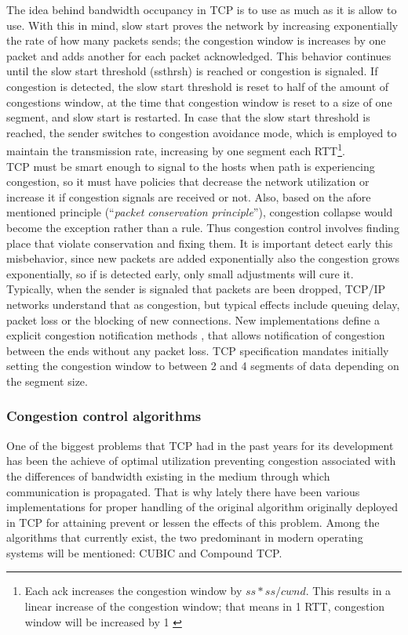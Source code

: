 The idea behind bandwidth occupancy in TCP is to use as much as it is allow to
use. With this in mind, slow start proves the network by increasing
exponentially the rate of how many packets sends; the congestion window is
increases by one packet and adds another for each packet acknowledged. This
behavior continues until the slow start threshold (ssthrsh) is reached or
congestion is signaled. If congestion is detected, the slow start threshold is
reset to half of the amount of congestions window, at the time that congestion
window is reset to a size of one segment, and slow start is restarted. In case
that the slow start threshold is reached, the sender switches to congestion
avoidance mode, which is employed to maintain the transmission rate,
increasing by one segment each RTT\footnote{Each ack increases the congestion
window by $ss*ss/cwnd$. This results in a linear increase of the congestion
window; that means in 1 RTT, congestion window will be increased by
1 \cite{JacobsonCAC} \cite{rfc879} \cite{rfc2460}}.\\

TCP must be smart enough to signal to the hosts when path is experiencing
congestion, so it must have policies that decrease the network utilization or
increase it if congestion signals are received or not. Also, based on the
afore mentioned principle (``\textit{packet conservation principle}''),
congestion collapse would become the exception rather than a rule. Thus
congestion control involves finding place that violate conservation and fixing
them. It is important detect early this misbehavior, since new packets are
added exponentially also the congestion grows exponentially, so if is detected
early, only small adjustments will cure it.\\

Typically, when the sender is signaled that packets are been dropped, TCP/IP
networks understand that as congestion, but typical effects include queuing
delay, packet loss or the blocking of new connections. New implementations
define a explicit congestion notification methods \cite{rfc3168}, that allows
notification of congestion between the ends without any packet loss. TCP
specification mandates initially setting the congestion window to between 2
and 4 segments of data depending on the segment size\cite{rfc3390}.

\subsubsection{Congestion control algorithms}
One of the biggest problems that TCP had in the past years for its development
has been the achieve of optimal utilization preventing congestion associated
with the differences of bandwidth existing in the medium through which
communication is propagated. That is why lately there have been various
implementations for proper handling of the original algorithm originally
deployed in TCP for attaining prevent or lessen the effects of this problem.
Among the algorithms that currently exist, the two predominant in modern
operating systems will be mentioned: CUBIC and Compound TCP.\\

